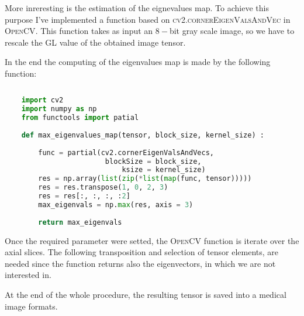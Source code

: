 \documentclass{standalone}
\begin{document}
	More inreresting is the estimation of the eignevalues map. To achieve this purpose I've implemented a function based on \textsc{cv2.cornerEigenValsAndVec} in \textsc{OpenCV}. This function takes as input an $8-$bit gray scale image, so we have to rescale the GL value of the obtained image tensor. 
	
	In the end the computing of the eigenvalues map is made by the following function: 
		\lstset{style=python}
	\begin{lstlisting}[language=python, caption=HU registration function, label=code:saf]
		
	import cv2
	import numpy as np
	from functools import patial
		
	def max_eigenvalues_map(tensor, block_size, kernel_size) :
		
		func = partial(cv2.cornerEigenValsAndVecs, 
						blockSize = block_size, 
							ksize = kernel_size)
		res = np.array(list(zip(*list(map(func, tensor)))))
		res = res.transpose(1, 0, 2, 3)
		res = res[:, :, :, :2]
		max_eigenvals = np.max(res, axis = 3)
	
		return max_eigenvals

	\end{lstlisting}

	Once the required parameter were setted, the \textsc{OpenCV} function is iterate over the axial slices. The following transposition and selection of tensor elements, are needed since the function returns also the eigenvectors, in which we are not interested in. 
	
	At the end of the whole procedure, the resulting tensor is saved into a medical image formats. 
	
	
\end{document}
